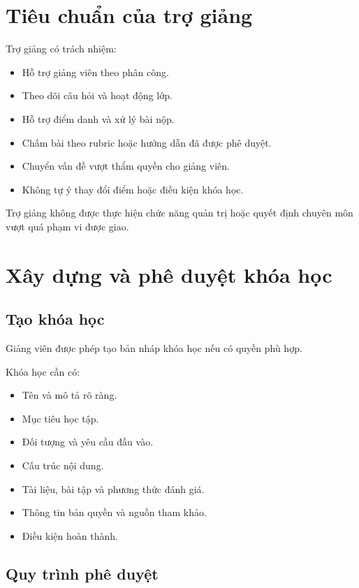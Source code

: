 \documentclass[12pt,a4paper]{article}
\begin{document}
\section{Tiêu chuẩn của trợ giảng}

Trợ giảng có trách nhiệm:

\begin{itemize}
    \item Hỗ trợ giảng viên theo phân công.
    \item Theo dõi câu hỏi và hoạt động lớp.
    \item Hỗ trợ điểm danh và xử lý bài nộp.
    \item Chấm bài theo rubric hoặc hướng dẫn đã được phê duyệt.
    \item Chuyển vấn đề vượt thẩm quyền cho giảng viên.
    \item Không tự ý thay đổi điểm hoặc điều kiện khóa học.
\end{itemize}

Trợ giảng không được thực hiện chức năng quản trị hoặc quyết định chuyên môn
vượt quá phạm vi được giao.

\section{Xây dựng và phê duyệt khóa học}

\subsection{Tạo khóa học}

Giảng viên được phép tạo bản nháp khóa học nếu có quyền phù hợp.

Khóa học cần có:

\begin{itemize}
    \item Tên và mô tả rõ ràng.
    \item Mục tiêu học tập.
    \item Đối tượng và yêu cầu đầu vào.
    \item Cấu trúc nội dung.
    \item Tài liệu, bài tập và phương thức đánh giá.
    \item Thông tin bản quyền và nguồn tham khảo.
    \item Điều kiện hoàn thành.
\end{itemize}

\subsection{Quy trình phê duyệt}
\end{document}
